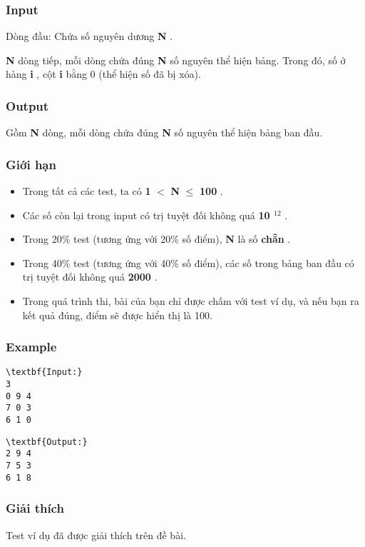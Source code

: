 \subsubsection{   Input  }

   Dòng đầu: Chứa số nguyên dương   \textbf{    N   }   .  

\textbf{    N   }   dòng tiếp, mỗi dòng chứa đúng   \textbf{    N   }   số nguyên thể hiện bảng. Trong đó, số ở hàng   \textbf{    i   }   , cột   \textbf{    i   }   bằng 0 (thể hiện số đã bị xóa).  

\subsubsection{   Output  }

   Gồm   \textbf{    N   }   dòng, mỗi dòng chứa đúng   \textbf{    N   }   số nguyên thể hiện bảng ban đầu.  

\subsubsection{   Giới hạn  }
\begin{itemize}
	\item     Trong tất cả các test, ta có    \textbf{     1    }    $<$    \textbf{     N    }     $\le$     \textbf{     100    }    .   
	\item     Các số còn lại trong input có trị tuyệt đối không quá    \textbf{     10     $^      12     $}    .   
	\item     Trong 20\% test (tương ứng với 20\% số điểm),    \textbf{     N    }    là số    \textbf{     chẵn    }    .   
	\item     Trong 40\% test (tương ứng với 40\% số điểm), các số trong bảng ban đầu có trị tuyệt đối không quá    \textbf{     2000    }    .   
	\item     Trong quá trình thi, bài của bạn chỉ được chấm với test ví dụ, và nếu bạn ra kết quả đúng, điểm sẽ được hiển thị là 100.   
\end{itemize}

\subsubsection{   Example  }
\begin{verbatim}
\textbf{Input:}
3
0 9 4
7 0 3
6 1 0
\end{verbatim}
\begin{verbatim}
\textbf{Output:}
2 9 4
7 5 3
6 1 8
\end{verbatim}

\subsubsection{   Giải thích  }

   Test ví dụ đã được giải thích trên đề bài.  
